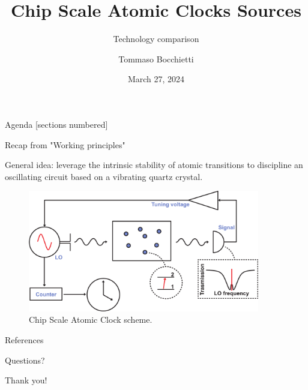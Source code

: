 \documentclass[10pt]{beamer}
\title{Chip Scale Atomic Clocks Sources}
\subtitle{Technology comparison}
\date{March 27, 2024}
\author{Tommaso Bocchietti}
\institute{University of Waterloo}
\begin{document}
\maketitle

\begin{frame}{Agenda}
    [sections numbered]
    \tableofcontents[hideallsubsections]
\end{frame}

\begin{frame}{Recap from "Working principles"}

    General idea: leverage the intrinsic stability of atomic transitions to discipline an oscillating circuit based on a vibrating quartz crystal.

    \begin{figure}
        \centering
        \includegraphics[width=0.9\textwidth]{pdf/CSAC-scheme.pdf}
        \caption{Chip Scale Atomic Clock scheme.}
    \end{figure}

\end{frame}





\appendix



\begin{frame}[allowframebreaks]{References}
    \nocite{*}
    
\end{frame}

\begin{frame}[standout]
    Questions?
\end{frame}

\begin{frame}[standout]
    Thank you!
\end{frame}
\end{document}
